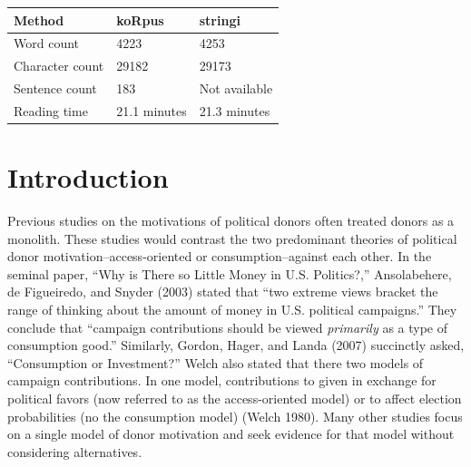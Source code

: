 \documentclass[12pt,]{article}
\begin{document}
\vskip -8.5pt



\noindent \doublespacing 

\begin{longtable}[]{@{}lll@{}}
\toprule
Method & koRpus & stringi\tabularnewline
\midrule
\endhead
Word count & 4223 & 4253\tabularnewline
Character count & 29182 & 29173\tabularnewline
Sentence count & 183 & Not available\tabularnewline
Reading time & 21.1 minutes & 21.3 minutes\tabularnewline
\bottomrule
\end{longtable}

\newpage

\hypertarget{introduction}{%
\section{Introduction}\label{introduction}}

Previous studies on the motivations of political donors often treated
donors as a monolith. These studies would contrast the two predominant
theories of political donor motivation--access-oriented or
consumption--against each other. In the seminal paper, ``Why is There so
Little Money in U.S. Politics?,'' Ansolabehere, de Figueiredo, and
Snyder (2003) stated that ``two extreme views bracket the range of
thinking about the amount of money in U.S. political campaigns.'' They
conclude that ``campaign contributions should be viewed \emph{primarily}
as a type of consumption good.'' Similarly, Gordon, Hager, and Landa
(2007) succinctly asked, ``Consumption or Investment?'' Welch also
stated that there two models of campaign contributions. In one model,
contributions to given in exchange for political favors (now referred to
as the access-oriented model) or to affect election probabilities (no
the consumption model) (Welch 1980). Many other studies focus on a
single model of donor motivation and seek evidence for that model
without considering alternatives.
\end{document}

